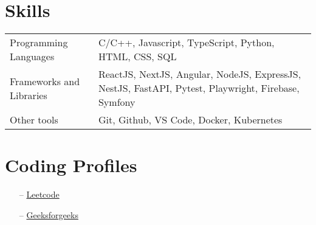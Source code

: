 \documentclass[a4paper,12pt]{article}
\begin{document}
\section{Skills}
\begin{tabularx}{\linewidth}{@{}l X@{}}
Programming Languages &  \normalsize{C/C++, Javascript, TypeScript, Python, HTML, CSS, SQL}\\
Frameworks and Libraries  &  \normalsize{ReactJS, NextJS, Angular, NodeJS, ExpressJS, NestJS, FastAPI, Pytest, Playwright, Firebase, Symfony}\\
Other tools  &  \normalsize{Git, Github, VS Code, Docker, Kubernetes}\\
\end{tabularx}

\section{Coding Profiles}
\begin{itemize}[nosep,after=\strut, leftmargin=1em, itemsep=3pt]
    \item[--] \href{https://leetcode.com/hardik0casr}{Leetcode}
    \item[--] \href{https://auth.geeksforgeeks.org/user/hardik0casr/profile}{Geeksforgeeks}
\end{itemize}
\end{document}
